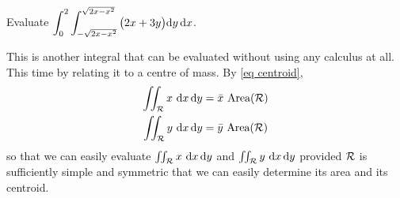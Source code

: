 \begin{eg}\label{eg dblInt J}
Evaluate $\displaystyle\int_0^2\int_{-\sqrt{2x-x^2}}^{\sqrt{2x-x^2}}
                                 \big(2x+3y\big)\mathrm{d}y\,\mathrm{d}x$.

\soln
This is another integral that can be evaluated without using any 
calculus at all. This time by relating it to a centre of mass. 
By \eqref{eq centroid},
\begin{align*}
\iint_{\mathcal{R}} x\ \mathrm{d}x\,\mathrm{d}y
  &=\bar x\ \text{Area}(\mathcal{R}) \\
\iint_{\mathcal{R}} y\ \mathrm{d}x\,\mathrm{d}y
  &=\bar y\ \text{Area}(\mathcal{R}) 
\end{align*}
so that we can easily evaluate $\iint_{\mathcal{R}} x\ \mathrm{d}x\,\mathrm{d}y$
and $\iint_{\mathcal{R}} y\ \mathrm{d}x\,\mathrm{d}y$ provided $\mathcal{R}$ is sufficiently
simple and symmetric that we can easily determine its area and its
centroid. 


\end{eg}
